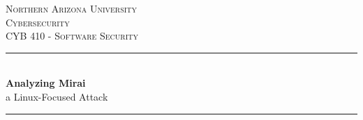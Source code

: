 \documentclass[12pt, letterpaper]{article}
\begin{document}
\newcommand{\paperauthor}{Akiel Aries}
\newcommand{\papersupervisor}{Prof. Sareh Assiri}
\newcommand{\paperuniversity}{Northern Arizona University}

\newcommand{\papertitle}{Analyzing Mirai}
\newcommand{\paperminortitle}{a Linux-Focused Attack}
\newcommand{\papermajorheading}{Cybersecurity}
\newcommand{\paperminorheading}{CYB 410 - Software Security}

\newcommand{\HRule}{\rule{\linewidth}{0.5mm}} %

\center %


\textsc{\LARGE \paperuniversity}\\[1.0cm] %
\textsc{\Large \papermajorheading}\\[0.2cm] %
\textsc{\large \paperminorheading}\\[0.75cm] %


\HRule \\[0.4cm]
{ \huge \bfseries \papertitle}\\[0.05cm] %
{ \huge \paperminortitle}\\[0.025cm] %
\HRule \\[3.5cm]

\begin{center}
\end{center}
\end{document}
